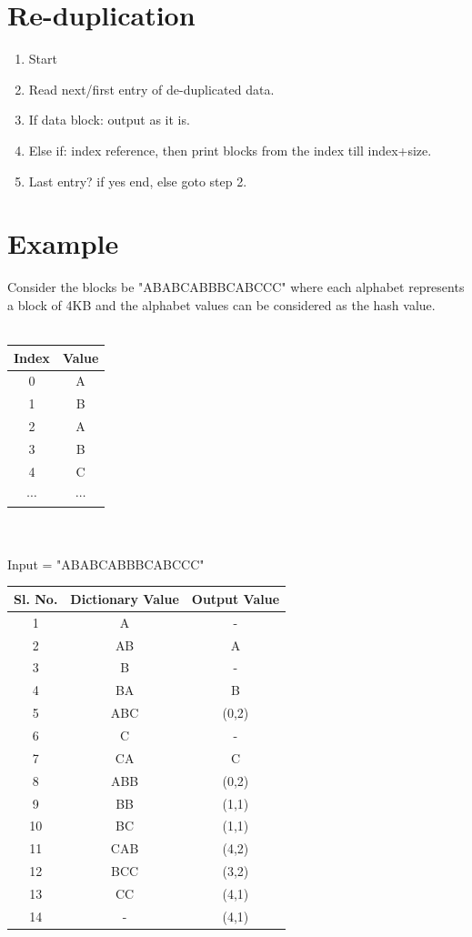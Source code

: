 \documentclass{article}
\begin{document}
   \section{Re-duplication}
   \begin{enumerate}
   \item Start
   \item Read next/first entry of de-duplicated data.
   \item If data block: output as it is.
   \item Else if: index reference, then print blocks from the index till index+size.
   \item Last entry? if yes end, else goto step 2.
   \end{enumerate}
   \section{Example}
   Consider the blocks be "ABABCABBBCABCCC" where each alphabet represents a block of 4KB and the alphabet values can be considered as the hash value.\\
\\
   \begin{tabular}{|c|c|}
   \hline
   \textbf{Index}&\textbf{Value} \\
   \hline
   0 & A\\
   1 & B\\
   2 & A\\
   3 & B\\
   4 & C\\
   $\cdots$&$\cdots$\\
   \hline   
   \end{tabular}\\
  \\
   Input = "ABABCABBBCABCCC"
   \begin{table}[!th]
   \begin{tabular}{|c|c|c|}
   \hline
   \textbf{Sl. No.} & \textbf{Dictionary Value} & \textbf{Output Value} \\
   \hline
   1 & A & -\\
   2 & AB & A\\
   3 & B & -\\
   4 & BA & B\\
   5 & ABC & (0,2)\\
   6 & C & -\\
   7 & CA & C\\
   8 & ABB & (0,2)\\
   9 & BB & (1,1)\\
   10 & BC & (1,1)\\
   11 & CAB & (4,2)\\
   12 & BCC & (3,2)\\
   13 & CC & (4,1)\\
   14 & - & (4,1)\\
   \hline
   \end{tabular}
   \end{table}
   \newpage
\end{document}
